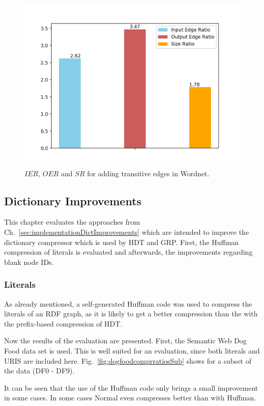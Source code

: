 \begin{figure}
	\centering
	\includegraphics[width=0.8\linewidth]{figures/4_evaluation/ontology/ratioTransitivesAdd}
	\caption{$IER$, $OER$ and $SR$ for adding transitive edges in Wordnet.}
	\label{fig:ratiotransitivesAdd}
\end{figure}


\subsection{Dictionary Improvements}\label{sec:evaluationDictImprovements}

This chapter evaluates the approaches from Ch.~\ref{sec:implementationDictImprovements} which are intended to improve the dictionary compressor \DHDT{} which is used by HDT and GRP. First, the Huffman compression of literals is evaluated and afterwards, the improvements regarding blank node IDs. 


\subsubsection{Literals}\label{sec:evaluationLiterals}

As already mentioned, a self-generated Huffman code was used to compress the literals of an RDF graph, as it is likely to get a better compression than the with the prefix-based compression of HDT.

Now the results of the evaluation are presented. First, the Semantic Web Dog Food data set is used. This is well suited for an evaluation, since both literals and URIS are included here. Fig.~\ref{fig:dogfoodcomprratiosSub} shows  for a subset of the data (DF0 - DF9). 

It can be seen that the use of the Huffman code only brings a small improvement in some cases. In some cases Normal \DHDT{} even compresses better than \DHDT{} with Huffman.

